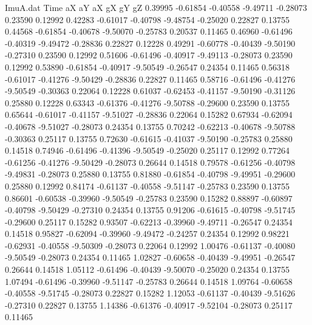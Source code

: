 \begin{filecontents}{ImuA.dat}
Time aX aY aX gX gY gZ
   0.39995   -0.61854   -0.40558   -9.49711   -0.28073    0.23590    0.12992
   0.42283   -0.61017   -0.40798   -9.48754   -0.25020    0.22827    0.13755
   0.44568   -0.61854   -0.40678   -9.50070   -0.25783    0.20537    0.11465
   0.46960   -0.61496   -0.40319   -9.49472   -0.28836    0.22827    0.12228
   0.49291   -0.60778   -0.40439   -9.50190   -0.27310    0.23590    0.12992
   0.51606   -0.61496   -0.40917   -9.49113   -0.28073    0.23590    0.12992
   0.53890   -0.61854   -0.40917   -9.50549   -0.26547    0.24354    0.11465
   0.56318   -0.61017   -0.41276   -9.50429   -0.28836    0.22827    0.11465
   0.58716   -0.61496   -0.41276   -9.50549   -0.30363    0.22064    0.12228
   0.61037   -0.62453   -0.41157   -9.50190   -0.31126    0.25880    0.12228
   0.63343   -0.61376   -0.41276   -9.50788   -0.29600    0.23590    0.13755
   0.65644   -0.61017   -0.41157   -9.51027   -0.28836    0.22064    0.15282
   0.67934   -0.62094   -0.40678   -9.51027   -0.28073    0.24354    0.13755
   0.70242   -0.62213   -0.40678   -9.50788   -0.30363    0.25117    0.13755
   0.72630   -0.61615   -0.41037   -9.50190   -0.25783    0.25880    0.14518
   0.74946   -0.61496   -0.41396   -9.50549   -0.25020    0.25117    0.12992
   0.77264   -0.61256   -0.41276   -9.50429   -0.28073    0.26644    0.14518
   0.79578   -0.61256   -0.40798   -9.49831   -0.28073    0.25880    0.13755
   0.81880   -0.61854   -0.40798   -9.49951   -0.29600    0.25880    0.12992
   0.84174   -0.61137   -0.40558   -9.51147   -0.25783    0.23590    0.13755
   0.86601   -0.60538   -0.39960   -9.50549   -0.25783    0.23590    0.15282
   0.88897   -0.60897   -0.40798   -9.50429   -0.27310    0.24354    0.13755
   0.91206   -0.61615   -0.40798   -9.51745   -0.29600    0.25117    0.15282
   0.93507   -0.62213   -0.39960   -9.49711   -0.26547    0.24354    0.14518
   0.95827   -0.62094   -0.39960   -9.49472   -0.24257    0.24354    0.12992
   0.98221   -0.62931   -0.40558   -9.50309   -0.28073    0.22064    0.12992
   1.00476   -0.61137   -0.40080   -9.50549   -0.28073    0.24354    0.11465
   1.02827   -0.60658   -0.40439   -9.49951   -0.26547    0.26644    0.14518
   1.05112   -0.61496   -0.40439   -9.50070   -0.25020    0.24354    0.13755
   1.07494   -0.61496   -0.39960   -9.51147   -0.25783    0.26644    0.14518
   1.09764   -0.60658   -0.40558   -9.51745   -0.28073    0.22827    0.15282
   1.12053   -0.61137   -0.40439   -9.51626   -0.27310    0.22827    0.13755
   1.14386   -0.61376   -0.40917   -9.52104   -0.28073    0.25117    0.11465

\end{filecontents}
